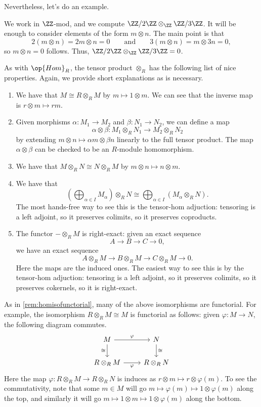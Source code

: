 Nevertheless, let's do an example.
\begin{example}
	We work in $\ZZ$-mod, and we compute $\ZZ/2\ZZ\otimes_\ZZ\ZZ/3\ZZ$. It will be enough to consider elements of the form $m\otimes n$. The main point is that
	\[2(m\otimes n)=2m\otimes n=0\qquad\text{and}\qquad3(m\otimes n)=m\otimes3n=0,\]
	so $m\otimes n=0$ follows. Thus, $\ZZ/2\ZZ\otimes_\ZZ\ZZ/3\ZZ=0$.
\end{example}
As with $\op{Hom}_R$, the tensor product $\otimes_R$ has the following list of nice properties. Again, we provide short explanations as is necessary.
\begin{enumerate}
	\item We have that $M\cong R\otimes_RM$ by $m\mapsto1\otimes m$. We can see that the inverse map is $r\otimes m\mapsto rm$.
	\item Given morphisms $\alpha:M_1\to M_2$ and $\beta:N_1\to N_2$, we can define a map
	\[\alpha\otimes\beta:M_1\otimes_R N_1\to M_2\otimes_R N_2\]
	by extending $m\otimes n\mapsto\alpha m\otimes\beta n$ linearly to the full tensor product. The map $\alpha\otimes\beta$ can be checked to be an $R$-module homomorphism.
	\item We have that $M\otimes_R N\cong N\otimes_R M$ by $m\otimes n\mapsto n\otimes m$.
	\item We have that
	\[\left(\bigoplus_{\alpha\in I}M_\alpha\right)\otimes_RN\cong\bigoplus_{\alpha\in I}(M_\alpha\otimes_R N).\]
	The most hands-free way to see this is the tensor-hom adjuction: tensoring is a left adjoint, so it preserves colimits, so it preserves coproducts.
	\item The functor $-\otimes_RM$ is right-exact: given an exact sequence
	\[A\to B\to C\to 0,\]
	we have an exact sequence
	\[A\otimes_RM\to B\otimes_RM\to C\otimes_RM\to 0.\]
	Here the maps are the induced ones. The easiest way to see this is by the tensor-hom adjuction: tensoring is a left adjoint, so it preserves colimits, so it preserves cokernels, so it is right-exact.
\end{enumerate}
\begin{remark}[Nir] \label{rem:tensorisofunctorial}
	As in \autoref{rem:homisofunctorial}, many of the above isomorphisms are functorial. For example, the isomorphism $R\otimes_RM\cong M$ is functorial as follows: given $\varphi:M\to N$, the following diagram commutes.
	\[\begin{tikzcd}
		M & N \\
		{R\otimes_RM} & {R\otimes_RN}
		\arrow["\cong"', from=1-1, to=2-1]
		\arrow["\cong", from=1-2, to=2-2]
		\arrow["\varphi", from=1-1, to=1-2]
		\arrow["\varphi"', from=2-1, to=2-2]
	\end{tikzcd}\]
	Here the map $\varphi:R\otimes_RM\to R\otimes_RN$ is induces as $r\otimes m\mapsto r\otimes\varphi(m)$. To see the commutativity, note that some $m\in M$ will go $m\mapsto\varphi(m)\mapsto1\otimes\varphi(m)$ along the top, and similarly it will go $m\mapsto1\otimes m\mapsto1\otimes\varphi(m)$ along the bottom.
\end{remark}
